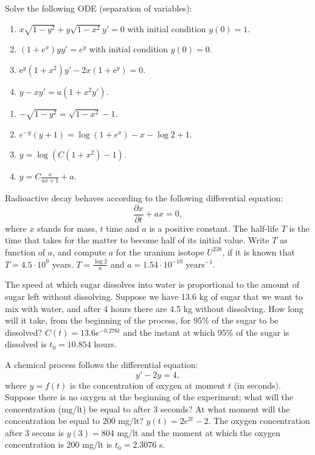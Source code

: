 
{Solve the following ODE (separation of variables):
\begin{enumerate}
\item $x\sqrt{1-y^2}+y\sqrt{1-x^2}y'=0$ with initial condition $y(0)=1$.
\item $(1+e^x)yy'=e^y$ with initial condition $y(0)=0$.
\item e$^y(1+x^2)y'-2x(1+\mbox{e}^y)=0$.
\item $y-xy'=a(1+x^2y')$.
\end{enumerate}
}
{
\begin{enumerate}
\item $-\sqrt{1-y^2}=\sqrt{1-x^2}-1$.
\item $e^{-y}(y+1)=\log(1+e^x)-x-\log 2+1$.
\item $y=\log(C(1+x^2)-1)$.
\item $y=C\frac{x}{ax+1}+a$.
\end{enumerate}
}
{}


{Radioactive decay behaves according to the following differential equation:
\[
\frac{\partial x}{\partial t}+ax=0,
\]
where $x$ stands for mass, $t$ time and $a$ is a positive constant.
The half-life $T$ is the time that takes for the matter to become half of
its initial value.
Write $T$ as function of $a$, and compute $a$ for the uranium isotope $U^{238}$, if it is known that $T=4.5\cdot10^9$ years.
}
{$T = \frac{\log 2}{a}$ and $a=1.54\cdot 10^{-10}$ years$^{-1}$.
}
{}



{The speed at which sugar dissolves into water is proportional to the amount of sugar left without dissolving.
Suppose we have 13.6 kg of sugar that we want to mix with water, and after 4 hours there are 4.5 kg
without dissolving.
How long will it take, from the beginning of the process, for 95\% of the sugar to be dissolved?}
{$C(t)= 13.6e^{-0.276 t}$ and the instant at which 95\% of the sugar is dissolved is $t_0=10.854$ hours.
}
{}



{A chemical process follows the differential equation:
\[
y'-2y=4,
\]
where $y=f(t)$ is the concentration of oxygen at moment $t$ (in
seconds).
Suppose there is no oxygen at the beginning of the experiment; what will the concentration (mg/lt) be equal to after 3 seconds?
At what moment will the concentration be equal to 200 mg/lt?
}
{$y(t)=2e^{2t}-2$. The oxygen concentration after 3 secons is $y(3)=804$ mg/lt and the moment at which the oxygen concentration is 200 mg/lt is $t_0=2.3076$ s.
}
{}



